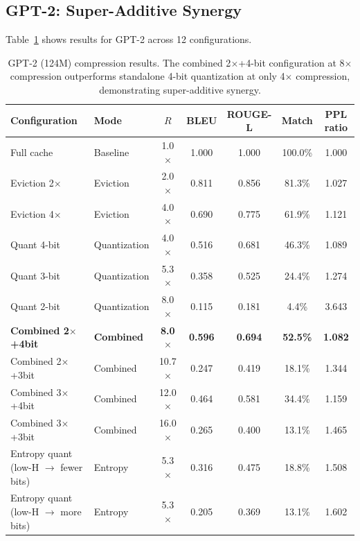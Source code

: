 \documentclass[11pt]{article}
\begin{document}
\subsection{GPT-2: Super-Additive Synergy}
\label{sec:gpt2_results}

Table~\ref{tab:gpt2_results} shows results for GPT-2 across 12 configurations.

\begin{table}[htbp]
\centering
\caption{GPT-2 (124M) compression results.  The combined 2$\times$+4-bit configuration at 8$\times$ compression outperforms standalone 4-bit quantization at only 4$\times$ compression, demonstrating super-additive synergy.}
\label{tab:gpt2_results}
\begin{tabular}{@{}llccccc@{}}
\toprule
Configuration & Mode & $R$ & BLEU & ROUGE-L & Match & PPL ratio \\
\midrule
Full cache & Baseline & 1.0$\times$ & 1.000 & 1.000 & 100.0\% & 1.000 \\
\midrule
Eviction 2$\times$ & Eviction & 2.0$\times$ & 0.811 & 0.856 & 81.3\% & 1.027 \\
Eviction 4$\times$ & Eviction & 4.0$\times$ & 0.690 & 0.775 & 61.9\% & 1.121 \\
\midrule
Quant 4-bit & Quantization & 4.0$\times$ & 0.516 & 0.681 & 46.3\% & 1.089 \\
Quant 3-bit & Quantization & 5.3$\times$ & 0.358 & 0.525 & 24.4\% & 1.274 \\
Quant 2-bit & Quantization & 8.0$\times$ & 0.115 & 0.181 & 4.4\% & 3.643 \\
\midrule
\textbf{Combined 2$\times$+4bit} & \textbf{Combined} & \textbf{8.0$\times$} & \textbf{0.596} & \textbf{0.694} & \textbf{52.5\%} & \textbf{1.082} \\
Combined 2$\times$+3bit & Combined & 10.7$\times$ & 0.247 & 0.419 & 18.1\% & 1.344 \\
Combined 3$\times$+4bit & Combined & 12.0$\times$ & 0.464 & 0.581 & 34.4\% & 1.159 \\
Combined 3$\times$+3bit & Combined & 16.0$\times$ & 0.265 & 0.400 & 13.1\% & 1.465 \\
\midrule
Entropy quant (low-H $\to$ fewer bits) & Entropy & 5.3$\times$ & 0.316 & 0.475 & 18.8\% & 1.508 \\
Entropy quant (low-H $\to$ more bits) & Entropy & 5.3$\times$ & 0.205 & 0.369 & 13.1\% & 1.602 \\
\bottomrule
\end{tabular}
\end{table}
\end{document}
